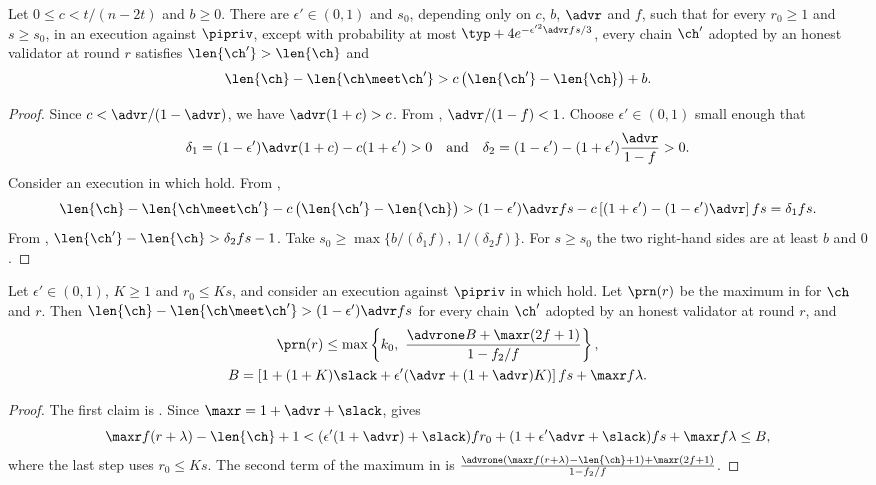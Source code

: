 \begin{corollary}[Tightness]\label{cor.tight}
    Let $0\le c<t/(n-2t)$ and $b\ge0$. There are $\epsilon'\in(0,1)$ and
    $s_0$, depending only on $c$, $b$, $\advr$ and $f$, such that for every
    $r_0\ge1$ and $s\ge s_0$, in an execution against $\pipriv$, except with probability at most $\typ+4e^{-\epsilon'^2\advr fs/3}$, every chain
    $\ch'$ adopted by an honest validator at round $r$ satisfies
    $\len{\ch'}>\len{\ch}$ and
    \[
        \len{\ch}-\len{\ch\meet\ch'} > c\left(\len{\ch'}-\len{\ch}\right)+b .
    \]
\end{corollary}
\begin{proof}
    Since $c<\advr/(1-\advr)$, we have $\advr(1+c)>c$. From ,
    $\advr/(1-f)<1$. Choose $\epsilon'\in(0,1)$ small enough that
    \[
        \delta_1=(1-\epsilon')\advr(1+c)-c(1+\epsilon')>0
        \quad\text{and}\quad
        \delta_2=(1-\epsilon')-(1+\epsilon')\frac{\advr}{1-f}>0 .
    \]
    Consider an execution in which
     hold. From
    ,
    \[
        \len{\ch}-\len{\ch\meet\ch'}-c\left(\len{\ch'}-\len{\ch}\right)
        > (1-\epsilon')\advr fs-c\left[(1+\epsilon')-(1-\epsilon')\advr\right]fs
        = \delta_1fs .
    \]
    From , $\len{\ch'}-\len{\ch}>\delta_2fs-1$. Take
    $s_0\ge\max\{b/(\delta_1f),\ 1/(\delta_2f)\}$. For $s\ge s_0$ the two
    right-hand sides are at least $b$ and $0$.
\end{proof}

\begin{corollary}\label{cor.roundtight}
    Let $\epsilon'\in(0,1)$, $K\ge1$ and $r_0\le Ks$, and consider an
    execution against $\pipriv$ in which  hold.
    Let $\prn(r)$ be the maximum in  for $\ch$ and $r$. Then
    $\len{\ch}-\len{\ch\meet\ch'}>(1-\epsilon')\advr fs$ for every chain
    $\ch'$ adopted by an honest validator at round $r$, and
    \begin{gather*}
        \prn(r)\le\max\left\{k_0,\ \frac{\advrone B+\maxr(2f+1)}{1-f_2/f}\right\},\\
        B=\left[1+(1+K)\slack+\epsilon'(\advr+(1+\advr)K)\right]fs+\maxr f\lambda .
    \end{gather*}
\end{corollary}
\begin{proof}
    The first claim is . Since $\maxr=1+\advr+\slack$,
     gives
    \[
        \maxr f(r+\lambda)-\len{\ch}+1
        < (\epsilon'(1+\advr)+\slack)fr_0+(1+\epsilon'\advr+\slack)fs+\maxr f\lambda
        \le B ,
    \]
    where the last step uses $r_0\le Ks$. The second term of the maximum in
     is
    $\frac{\advrone(\maxr f(r+\lambda)-\len{\ch}+1)+\maxr(2f+1)}{1-f_2/f}$.
\end{proof}

